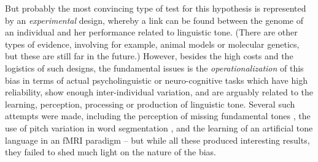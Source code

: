\documentclass[twoside,onecolumn]{article}
\begin{document}
But probably the most convincing type of test for this hypothesis is represented by an \emph{experimental} design, whereby a link can be found between the genome of an individual and her performance related to linguistic tone.
(There are other types of evidence, involving for example, animal models or molecular genetics, but these are still far in the future.)
However, besides the high costs and the logistics of such designs, the fundamental issues is the \emph{operationalization} of this bias in terms of actual psycholinguistic or neuro-cognitive tasks which have high reliability, show enough inter-individual variation, and are arguably related to the learning, perception, processing or production of linguistic tone.
Several such attempts were made, including the perception of missing fundamental tones \citep{ladd_missingfund_2013}, the use of pitch variation in word segmentation \citep{caldwellharris_factors_2015}, and the learning of an artificial tone language in an fMRI paradigm \citep{asaridou_repetition_2016} -- but while all these produced interesting results, they failed to shed much light on the nature of the bias.
\end{document}
